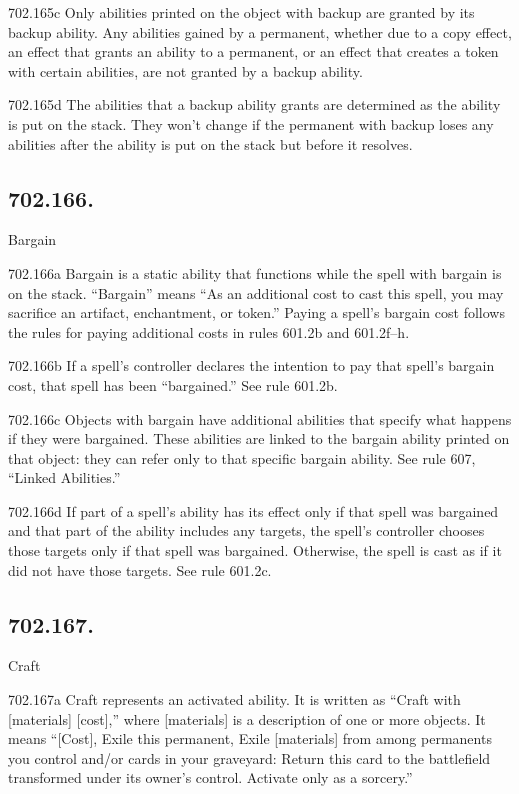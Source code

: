 702.165c Only abilities printed on the object with backup are granted by its backup ability. Any abilities gained by a permanent, whether due to a copy effect, an effect that grants an ability to a permanent, or an effect that creates a token with certain abilities, are not granted by a backup ability.

702.165d The abilities that a backup ability grants are determined as the ability is put on the stack. They won’t change if the permanent with backup loses any abilities after the ability is put on the stack but before it resolves.

\subsection*{702.166.}
Bargain

702.166a Bargain is a static ability that functions while the spell with bargain is on the stack. “Bargain” means “As an additional cost to cast this spell, you may sacrifice an artifact, enchantment, or token.” Paying a spell’s bargain cost follows the rules for paying additional costs in rules 601.2b and 601.2f–h.

702.166b If a spell’s controller declares the intention to pay that spell’s bargain cost, that spell has been “bargained.” See rule 601.2b.

702.166c Objects with bargain have additional abilities that specify what happens if they were bargained. These abilities are linked to the bargain ability printed on that object: they can refer only to that specific bargain ability. See rule 607, “Linked Abilities.”

702.166d If part of a spell’s ability has its effect only if that spell was bargained and that part of the ability includes any targets, the spell’s controller chooses those targets only if that spell was bargained. Otherwise, the spell is cast as if it did not have those targets. See rule 601.2c.

\subsection*{702.167.}
Craft

702.167a Craft represents an activated ability. It is written as “Craft with [materials] [cost],” where [materials] is a description of one or more objects. It means “[Cost], Exile this permanent, Exile [materials] from among permanents you control and/or cards in your graveyard: Return this card to the battlefield transformed under its owner’s control. Activate only as a sorcery.”

